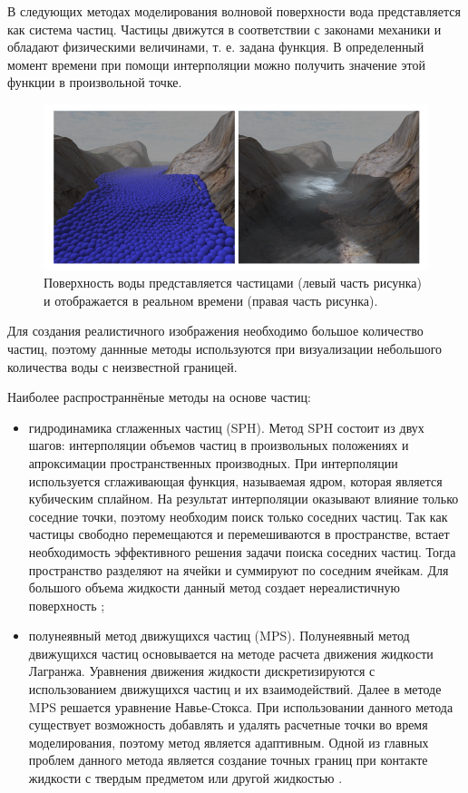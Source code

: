 В следующих методах моделирования волновой поверхности вода представляется как система частиц. Частицы движутся в соответствии с законами механики и обладают физическими величинами, т. е. задана функция. В определенный момент времени при помощи интерполяции можно получить значение этой функции в произвольной точке.

\begin{figure}[H]
	\begin{center}
		\includegraphics[scale=0.5]{img/particle.png}
	\end{center}
	\captionsetup{justification=centering}
	\caption{Поверхность воды представляется частицами (левый часть рисунка) и отображается в реальном времени (правая часть рисунка). }
	\label{img:particle}
\end{figure}

Для создания реалистичного изображения необходимо большое количество частиц, поэтому даннные методы используются при визуализации небольшого количества воды с неизвестной границей.   

Наиболее распространнёные методы на основе частиц:

\begin{itemize}
    \item гидродинамика сглаженных частиц (SPH). Метод SPH состоит из двух шагов: интерполяции объемов частиц в произвольных положениях и апроксимации пространственных производных. При интерполяции используется сглаживающая функция, называемая ядром, которая является кубическим сплайном. На результат интерполяции оказывают влияние только соседние точки, поэтому необходим поиск только соседних частиц. Так как частицы свободно перемещаются и перемешиваются в пространстве, встает необходимость эффективного решения задачи поиска соседних частиц. Тогда пространство разделяют на ячейки и суммируют по соседним ячейкам. Для большого объема жидкости данный метод создает нереалистичную поверхность \cite{sph};
    \item полунеявный метод движущихся частиц (MPS). Полунеявный метод движущихся частиц основывается на методе расчета движения жидкости Лагранжа. Уравнения движения жидкости дискретизируются с использованием движущихся частиц и их взаимодействий. Далее в методе MPS решается уравнение Навье-Стокса. При использовании данного метода существует возможность добавлять и удалять расчетные точки во время моделирования, поэтому метод является адаптивным. Одной из главных проблем данного метода является создание точных границ при контакте жидкости с твердым предметом или другой жидкостью \cite{mps}.
\end{itemize}

